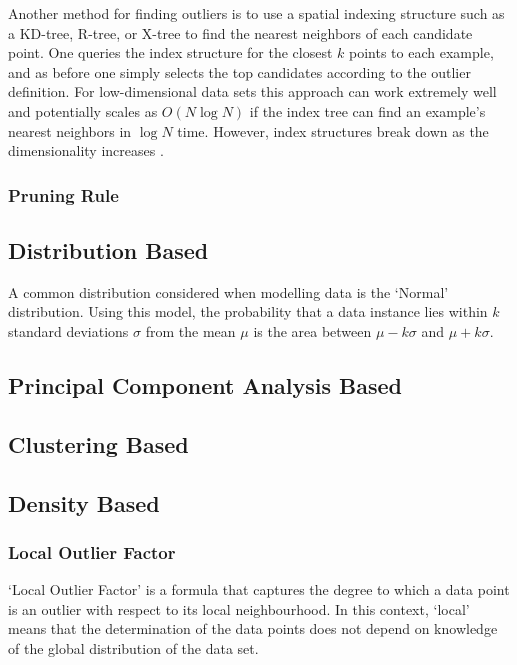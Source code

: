 Another method for finding outliers is to use a spatial indexing structure such
as a KD-tree, R-tree, or X-tree to find the nearest neighbors of each candidate
point. One queries the index structure for the closest $k$ points to each
example, and as before one simply selects the top candidates according to the
outlier definition. For low-dimensional data sets this approach can work
extremely well and potentially scales as $O(N \log N)$ if the index tree can
find an example's nearest neighbors in $\log N$ time. However, index structures
break down as the dimensionality increases \cite{Bay:2003}.

\subsubsection{Pruning Rule}
\label{anomalyDetection:approaches:distance:pruning}

\subsection{Distribution Based}
\label{anomalyDetection:approaches:distribution}
A common distribution considered when modelling data is the `Normal'
distribution. Using this model, the probability that a data instance lies within
$k$ standard deviations $\sigma$ from the mean $\mu$ is the area between
$\mu - k\sigma$ and $\mu + k\sigma$.

\subsection{Principal Component Analysis Based}
\label{anomalyDetection:pca}

\subsection{Clustering Based}
\label{anomalyDetection:clustering}

\subsection{Density Based}
\label{anomalyDetection:density}

\subsubsection{Local Outlier Factor}
\label{localOutlierFactor}
`Local Outlier Factor' is a formula that captures the degree to which a data
point is an outlier with respect to its local neighbourhood. In this context,
`local' means that the determination of the data points does not depend on
knowledge of the global distribution of the data set.
